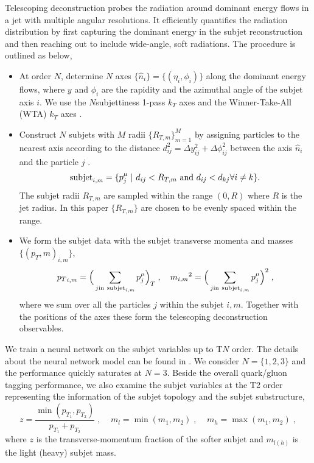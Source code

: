 \documentclass[notoc]{JHEP3}
\def\in{{\rm in}}
\begin{document}
Telescoping deconstruction probes the radiation around dominant energy flows in a jet with multiple angular resolutions. It efficiently quantifies the radiation distribution by first capturing the dominant energy in the subjet reconstruction and then reaching out to include wide-angle, soft radiations. The procedure is outlined as below,
    \begin{itemize}
        \item At order $N$, determine $N$ axes $\{\hat n_i\}=\{(\eta_i,\phi_i)\}$ along the dominant energy flows, where $y$ and $\phi_i$ are the rapidity and the azimuthal angle of the subjet axis $i$. We use the $N$subjettiness 1-pass $k_T$ axes and the Winner-Take-All (WTA) $k_T$ axes \cite{Thaler:2010tr}.
        \item Construct $N$ subjets with $M$ radii $\{R_{T,m}\}^M_{m=1}$ by assigning particles to the nearest axis according to the distance $d^2_{ij} = \Delta y_{ij}^2+\Delta \phi_{ij}^2$ between the axis $\hat n_i$ and the particle $j$ \cite{Stewart:2010tn,Chien:2013kca,Stewart:2015waa,Thaler:2015xaa}.
            \begin{equation}
                {\rm subjet}_{i,m} = \{p^\mu_j~|~d_{ij}<R_{T,m}~{\rm and}~d_{ij}<d_{kj} \forall i\neq k\}.
            \end{equation}
            The subjet radii ${R_{T,m}}$ are sampled within the range $(0,R)$ where $R$ is the jet radius. In this paper $\{R_{T,m}\}$ are chosen to be evenly spaced within the range.
        \item We form the subjet data with the subjet transverse momenta and masses $\{(p_T,m)_{i,m}\}$,
            \begin{equation}
                {p_T}_{i,m}=\Big(\sum_{j\in~{\rm subjet}_{i,m}}p^\mu_j\Big)_T\;,~~~{m_{i,m}}^2=\Big(\sum_{j\in~{\rm subjet}_{i,m}}p^\mu_j\Big)^2\;,
            \end{equation}
            where we sum over all the particles $j$ within the subjet $i,m$. Together with the positions of the axes these form the telescoping deconstruction observables.
    \end{itemize}

We train a neural network on the subjet variables up to T$N$ order. The details about the neural network model can be found in \cite{Chien:2017decon}. We consider $N=\{1,2,3\}$ and the performance quickly saturates at $N=3$. Beside the overall quark/gluon tagging performance, we also examine the subjet variables at the T2 order representing the information of the subjet topology and the subjet substructure,
    \begin{equation}
        z=\frac{\min(p_{T_1},p_{T_2})}{p_{T_1}+p_{T_2}}\;,~~~~~m_l=\min(m_1,m_2)\;,~~~~~m_h=\max(m_1,m_2)\;,
    \end{equation}
where $z$ is the transverse-momentum fraction of the softer subjet and $m_{l(h)}$ is the light (heavy) subjet mass.
\end{document}
